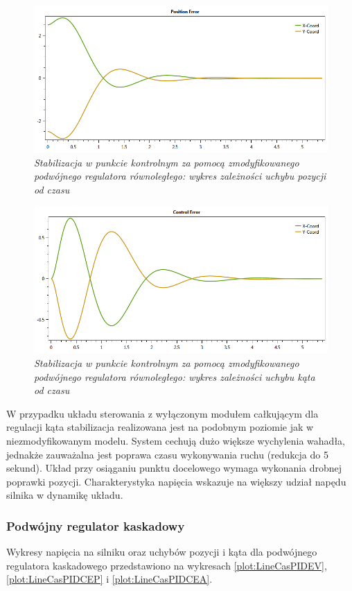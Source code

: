 \documentclass[12pt, twoside, openany]{report}
\theoremstyle{definition}
\begin{document}
\begin{figure}[H]
	\centering
		\includegraphics[width = 350pt]{LinePDCEP} 
		\caption{\textit{Stabilizacja w punkcie kontrolnym za pomocą zmodyfikowanego podwójnego regulatora równoległego: wykres zależności uchybu pozycji od czasu}}
		\label{plot:LinePDCEP}
\end{figure}

\begin{figure}[H]
	\centering
		\includegraphics[width = 350pt]{LinePDCEA} 
		\caption{\textit{Stabilizacja w punkcie kontrolnym za pomocą zmodyfikowanego podwójnego regulatora równoległego: wykres zależności uchybu kąta od czasu}}
		\label{plot:LinePDCEA}
\end{figure}

W przypadku układu sterowania z wyłączonym modułem całkującym dla regulacji kąta stabilizacja realizowana jest na podobnym poziomie jak w niezmodyfikowanym modelu. System cechują dużo większe wychylenia wahadła, jednakże zauważalna jest poprawa czasu wykonywania ruchu (redukcja do 5 sekund). Układ przy osiąganiu punktu docelowego wymaga wykonania drobnej poprawki pozycji. Charakterystyka napięcia wskazuje na większy udział napędu silnika w dynamikę układu. 

\subsubsection{Podwójny regulator kaskadowy}
Wykresy napięcia na silniku oraz uchybów pozycji i kąta dla podwójnego regulatora kaskadowego przedstawiono na wykresach \ref{plot:LineCasPIDEV}, \ref{plot:LineCasPIDCEP} i \ref{plot:LineCasPIDCEA}.
\end{document}
